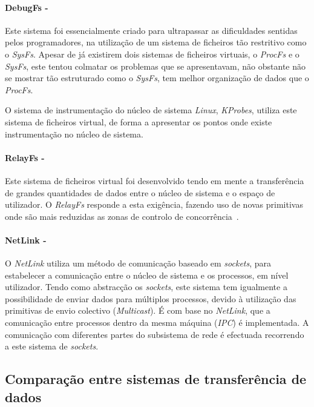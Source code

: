 \paragraph*{DebugFs - }\label{cap:DebugFs_overview}

Este sistema foi essencialmente criado para ultrapassar as dificuldades sentidas pelos programadores, na utilização de um sistema de ficheiros tão restritivo como o \textit{SysFs}.
Apesar de já existirem dois sistemas de ficheiros virtuais, o \textit{ProcFs} e o \textit{SysFs}, este tentou colmatar os problemas que se apresentavam, não obstante não se mostrar tão estruturado como o \textit{SysFs}, tem melhor organização de dados que o \textit{ProcFs}.

O sistema de instrumentação do núcleo de sistema \textit{Linux}, \textit{KProbes}, utiliza este sistema de ficheiros virtual, de forma a apresentar os pontos onde existe instrumentação no núcleo de sistema.

\paragraph*{RelayFs - }\label{cap:RelayFs_overview}

Este sistema de ficheiros virtual foi desenvolvido tendo em mente a transferência de grandes quantidades de dados entre o núcleo de sistema e o espaço de utilizador.
O \textit{RelayFs} responde a esta exigência, fazendo uso de novas primitivas onde são mais reduzidas as zonas de controlo de concorrência~\cite{Donovan2007,To03relayfs:an}.

\paragraph*{NetLink - }\label{cap:NetLink_overview}
O \textit{NetLink} utiliza um método de comunicação baseado em \textit{sockets}, para estabelecer a comunicação entre o núcleo de sistema e os processos, em nível utilizador. 
 Tendo como abstracção os \textit{sockets}, este sistema tem igualmente a possibilidade de enviar dados para múltiplos processos, devido à utilização das primitivas de envio colectivo (\textit{Multicast}).
 É com base no \textit{NetLink}, que a comunicação entre processos dentro da mesma máquina (\textit{IPC}) é implementada.
 A comunicação com diferentes partes do subsistema de rede é efectuada recorrendo a este sistema de \textit{sockets}.


\subsection{Comparação entre sistemas de transferência de dados}

